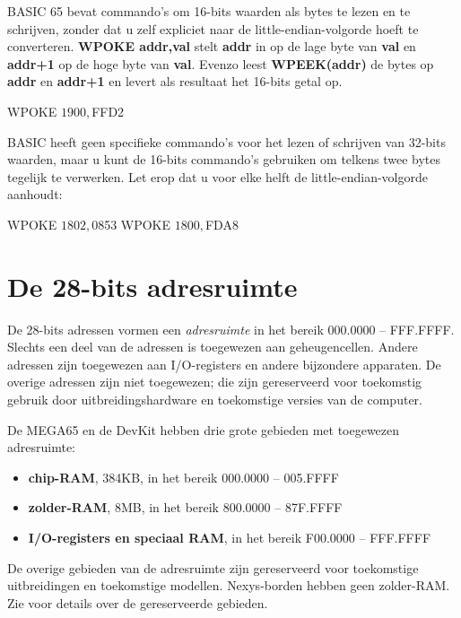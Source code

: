 BASIC 65 bevat commando's om 16-bits waarden als bytes te lezen en te schrijven, zonder dat u zelf expliciet naar de little-endian-volgorde hoeft te converteren. {\bf WPOKE addr,val} stelt {\bf addr} in op de lage byte van {\bf val} en {\bf addr+1} op de hoge byte van {\bf val}. Evenzo leest {\bf WPEEK(addr)} de bytes op {\bf addr} en {\bf addr+1} en levert als resultaat het 16-bits getal op.

\begin{basiccode}
WPOKE $1900,$FFD2
\end{basiccode}

BASIC heeft geen specifieke commando's voor het lezen of schrijven van 32-bits waarden, maar u kunt de 16-bits commando's gebruiken om telkens twee bytes tegelijk te verwerken. Let erop dat u voor elke helft de little-endian-volgorde aanhoudt:

\begin{basiccode}
WPOKE $1802, $0853
WPOKE $1800, $FDA8
\end{basiccode}


\newpage
\section{De 28-bits adresruimte}
\label{sec:programming-with-memory-address-space}

De 28-bits adressen vormen een {\em adresruimte} in het bereik 000.0000 -- FFF.FFFF. Slechts een deel van de adressen is toegewezen aan geheugencellen. Andere adressen zijn toegewezen aan I/O-registers en andere bijzondere apparaten. De overige adressen zijn niet toegewezen; die zijn gereserveerd voor toekomstig gebruik door uitbreidingshardware en toekomstige versies van de computer.

De MEGA65 en de DevKit hebben drie grote gebieden met toegewezen adresruimte:

\begin{itemize}
\item {\bf chip-RAM}, 384KB, in het bereik 000.0000 -- 005.FFFF\item {\bf zolder-RAM}, 8MB, in het bereik 800.0000 -- 87F.FFFF\item {\bf I/O-registers en speciaal RAM}, in het bereik F00.0000 -- FFF.FFFF
\end{itemize}

De overige gebieden van de adresruimte zijn gereserveerd voor toekomstige uitbreidingen en toekomstige modellen. Nexys-borden hebben geen zolder-RAM. Zie  voor details over de gereserveerde gebieden.


